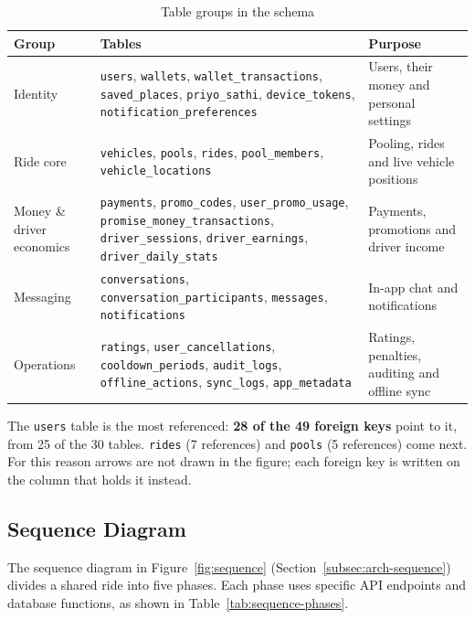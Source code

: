 \begin{table}[H]
  \centering
  \small
  \caption{Table groups in the schema}
  \label{tab:table-groups}
  \begin{tabularx}{\textwidth}{@{}p{2.6cm}LL@{}}
    \toprule
    \textbf{Group} & \textbf{Tables} & \textbf{Purpose} \\
    \midrule
    Identity & \texttt{users}, \texttt{wallets}, \texttt{wallet\_transactions}, \texttt{saved\_places}, \texttt{priyo\_sathi}, \texttt{device\_tokens}, \texttt{notification\_preferences} & Users, their money and personal settings \\
    Ride core & \texttt{vehicles}, \texttt{pools}, \texttt{rides}, \texttt{pool\_members}, \texttt{vehicle\_locations} & Pooling, rides and live vehicle positions \\
    Money \& driver economics & \texttt{payments}, \texttt{promo\_codes}, \texttt{user\_promo\_usage}, \texttt{promise\_money\_transactions}, \texttt{driver\_sessions}, \texttt{driver\_earnings}, \texttt{driver\_daily\_stats} & Payments, promotions and driver income \\
    Messaging & \texttt{conversations}, \texttt{conversation\_participants}, \texttt{messages}, \texttt{notifications} & In-app chat and notifications \\
    Operations & \texttt{ratings}, \texttt{user\_cancellations}, \texttt{cooldown\_periods}, \texttt{audit\_logs}, \texttt{offline\_actions}, \texttt{sync\_logs}, \texttt{app\_metadata} & Ratings, penalties, auditing and offline sync \\
    \bottomrule
  \end{tabularx}
\end{table}

The \texttt{users} table is the most referenced: \textbf{28 of the 49 foreign
keys} point to it, from 25 of the 30 tables. \texttt{rides} (7 references) and
\texttt{pools} (5 references) come next. For this reason arrows are not drawn
in the figure; each foreign key is written on the column that holds it instead.

\subsection{Sequence Diagram}
\label{subsec:sequence}

The sequence diagram in Figure~\ref{fig:sequence}
(Section~\ref{subsec:arch-sequence}) divides a shared ride into five phases.
Each phase uses specific API endpoints and database functions, as shown in
Table~\ref{tab:sequence-phases}.

